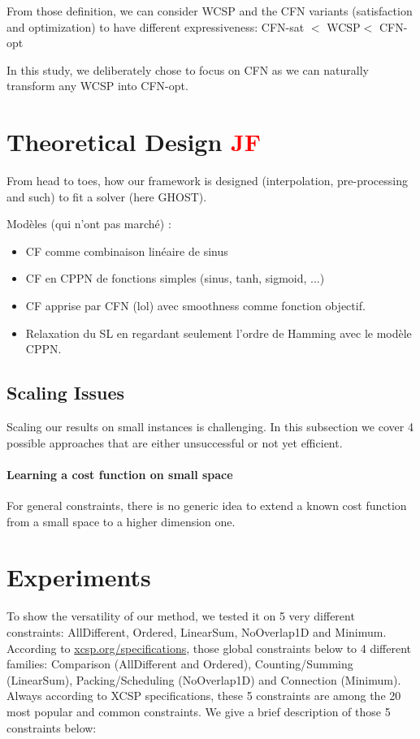 \documentclass{article}
\newcommand{\cfn}{\textsc{CFN}\xspace}
\newcommand{\wcsp}{\textsc{WCSP}\xspace}
\newcommand{\jf}{\textcolor{red}{\bf JF}\xspace}
\begin{document}
From those  definition, we  can consider \wcsp  and the  \cfn variants
(satisfaction  and  optimization)  to have  different  expressiveness:
\cfn-sat $<$ \wcsp $<$ \cfn-opt

In  this study,  we deliberately  chose  to focus  on \cfn  as we  can
naturally transform any \wcsp into \cfn-opt.

\section{Theoretical Design \jf}\label{sec:theory}
From  head to  toes,  how our  framework  is designed  (interpolation,
pre-processing and such) to fit a solver (here GHOST).

Modèles (qui n'ont pas marché) :
\begin{itemize}
\item CF comme combinaison linéaire de sinus
\item CF en CPPN de fonctions simples (sinus, tanh, sigmoid, ...)
\item CF apprise par CFN (lol) avec smoothness comme fonction objectif.
\item Relaxation du SL en regardant seulement l'ordre de Hamming avec le modèle CPPN.
\end{itemize}

\subsection{Scaling Issues}\label{subsec:issues}
Scaling  our  results  on  small instances  is  challenging.  In  this
subsection we cover 4 possible approaches that are either unsuccessful
or not yet efficient.

\paragraph{Learning a cost function on small space}
For general constraints, there is no generic idea to extend a known cost
function from a small space to a higher dimension one.

\section{Experiments}\label{sec:xp}

To  show  the versatility  of  our  method, we  tested  it  on 5  very
different constraints:  AllDifferent, Ordered,  LinearSum, NoOverlap1D
and                Minimum.                According                to
\href{http://xcsp.org/specifications}{xcsp.org/specifications},  those
global  constraints   below  to   4  different   families:  Comparison
(AllDifferent    and     Ordered),    Counting/Summing    (LinearSum),
Packing/Scheduling  (NoOverlap1D)  and Connection  (Minimum).   Always
according to XCSP specifications, these 5 constraints are among the 20
most popular  and common constraints.  We give a brief  description of
those 5 constraints below:
\end{document}
